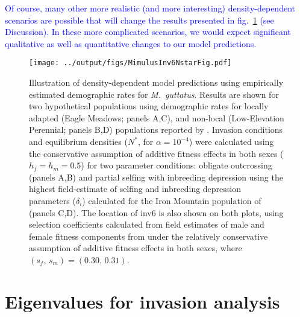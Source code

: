 \documentclass[11pt]{article}
\begin{document}
\textcolor{blue}{Of course, many other more realistic (and more interesting) density-dependent scenarios are possible that will change the results presented in fig.~\ref{fig:mimulusFig_dd} (see Discussion). In these more complicated scenarios, we would expect significant qualitative as well as quantitative changes to our model predictions. }

\begin{figure}[htbp]
 \centering
 \texttt{[image: ../output/figs/MimulusInv6NstarFig.pdf]}
 \caption{\footnotesize{Illustration of density-dependent model predictions using empirically estimated demographic rates for {\itshape M.~guttatus}. Results are shown for two hypothetical populations using demographic rates for locally adapted (Eagle Meadows; panels A,C), and non-local (Low-Elevation Perennial; panels B,D) populations reported by \citet{PetersonEtAl2016}. Invasion conditions and equilibrium densities ($N^{\ast}$, for $\alpha = 10^{-4}$) were calculated using the conservative assumption of additive fitness effects in both sexes ($h_f = h_m = 0.5$) for two parameter conditions: obligate outcrossing (panels A,B) and partial selfing with inbreeding depression using the highest field-estimate of selfing and inbreeding depression parameters ($\delta_i$) calculated for the Iron Mountain population of \citet{Willis1993} (panels C,D). The location of inv6 is also shown on both plots, using selection coefficients calculated from field estimates of male and female fitness components from \citet{LeeKelly2015} under the relatively conservative assumption of additive fitness effects in both sexes, where $(s_f,\,s_m) = (0.30,\, 0.31)$.}} 
 \label{fig:mimulusFig_dd}
 \end{figure}


\newpage
\section{Eigenvalues for invasion analysis}\label{App:Eigen}
\renewcommand{\theequation}{C\arabic{equation}}
\setcounter{equation}{0}  %
\setcounter{table}{0}  %
\end{document}
